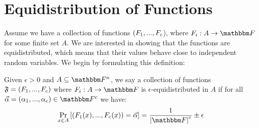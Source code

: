 \section[Equidistribution of Functions]{Equidistribution of Functions}\label{sec:equidistribution-of-functions}
Assume we have a collection of functions $(\genfunc_1,...,\genfunc_c$), where $\funcdef{\genfunc_i}{A}{\basefield}$ for some finite set $A$.
We are interested in showing that the functions are equidistributed, which means that their values behave close to independent random variables.
We begin by formulating this definition:
\begin{definition}
    Given $\epsilon > 0$ and $A \subseteq \field$,
    we say a collection of functions $\genfuncset = (\genfunc_1,...,\genfunc_c)$ where $\funcdef{\genfunc_i}{\genset}{\basefield}$ is $\epsilon$-equidistributed in $A$ if for all $\vec{\alpha} = (\alpha_1,...,\alpha_c) \in \basefield^c$ we have:
    \[
        \prex{x \in A}{(\genfunc_1(x),...,\genfunc_c(x)) = \vec{\alpha}} = \frac{1}{\abs{\basefield}^c} \pm \epsilon
    \]
\end{definition}

